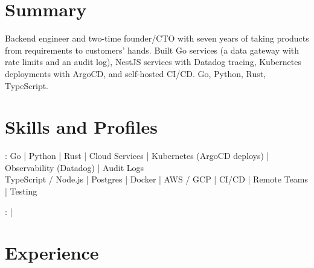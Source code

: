 \documentclass[print]{jack-resume}
\begin{document}
\pagecolor{darkmodeBackground}


\begin{minipage}[t][1cm][t]{.03\textwidth}
    \hfill
\end{minipage}

\section{Summary}
Backend engineer and two-time founder/CTO with seven years of taking products from requirements to customers' hands. Built Go services (a data gateway with rate limits and an audit log), NestJS services with Datadog tracing, Kubernetes deployments with ArgoCD, and self-hosted CI/CD. Go, Python, Rust, TypeScript.
\sectionsep

\section{Skills and Profiles}
:
Go \hfill | \hfill
Python \hfill | \hfill
Rust \hfill | \hfill
Cloud Services \hfill | \hfill
Kubernetes (ArgoCD deploys) \hfill | \hfill
Observability (Datadog) \hfill | \hfill
Audit Logs \\
\hspace{1.0cm} TypeScript / Node.js \hfill | \hfill
Postgres \hfill | \hfill
Docker \hfill | \hfill
AWS / GCP \hfill | \hfill
CI/CD \hfill | \hfill
Remote Teams \hfill | \hfill
Testing \\

\raggedright{
    :
      \href{https://www.linkedin.com/in/jack-sturtevant/}{ \ExternalLink} |
     \href{https://github.com/jacksturt}{ \ExternalLink}}

\section{Experience}
\end{document}
